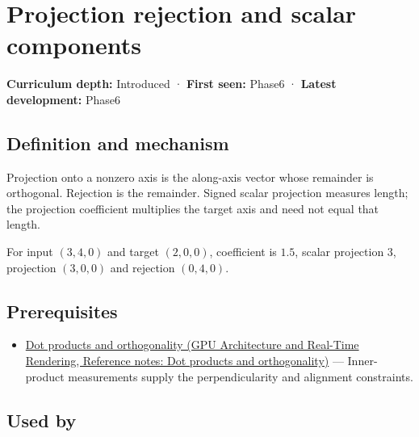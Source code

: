 \hypertarget{appendix-505a502c372a}{}\label{referencestart:appendix-505a502c372a}
\section{Projection rejection and scalar components}\label{appendix-505a502c372a-projection-rejection-and-scalar-components}

\textbf{Curriculum depth:} Introduced · \textbf{First seen:} Phase6 · \textbf{Latest development:} Phase6

\begin{allmightroledefinition}

\subsection{Definition and mechanism}\label{appendix-505a502c372a-definition-and-mechanism}

Projection onto a nonzero axis is the along-axis vector whose remainder is orthogonal. Rejection is the remainder. Signed scalar projection measures length; the projection coefficient multiplies the target axis and need not equal that length.

\end{allmightroledefinition}

For input \((3,4,0)\) and target \((2,0,0)\), coefficient is \(1.5\), scalar projection \(3\), projection \((3,0,0)\) and rejection \((0,4,0)\).

\subsection{Prerequisites}\label{appendix-505a502c372a-prerequisites}

\begin{itemize}
\tightlist
\item
  \href{../06-GPU-Architecture-and-Real-Time-Rendering/main.pdf\#nameddest=appendix-8bc4e8fc547c}{Dot products and orthogonality (GPU Architecture and Real-Time Rendering, Reference notes: Dot products and orthogonality)} --- Inner-product measurements supply the perpendicularity and alignment constraints.
\end{itemize}

\subsection{Used by}\label{appendix-505a502c372a-used-by}

